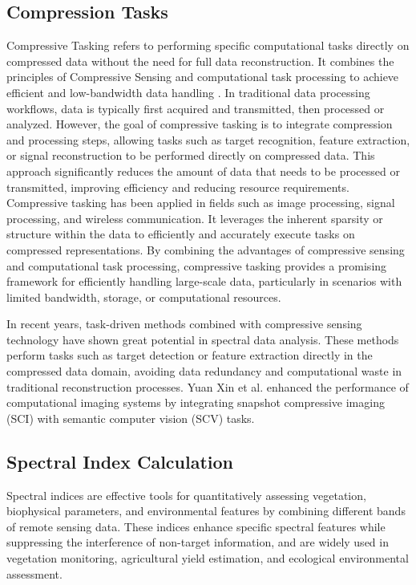 \documentclass[preprint,review,12pt]{elsarticle}
\begin{document}
\subsection{Compression Tasks}
\label{sec:compression_tasks}

Compressive Tasking refers to performing specific computational tasks directly on compressed data without the need for full data reconstruction. It combines the principles of Compressive Sensing and computational task processing to achieve efficient and low-bandwidth data handling \cite{zhang2022}. In traditional data processing workflows, data is typically first acquired and transmitted, then processed or analyzed. However, the goal of compressive tasking is to integrate compression and processing steps, allowing tasks such as target recognition, feature extraction, or signal reconstruction to be performed directly on compressed data. This approach significantly reduces the amount of data that needs to be processed or transmitted, improving efficiency and reducing resource requirements. Compressive tasking has been applied in fields such as image processing, signal processing, and wireless communication. It leverages the inherent sparsity or structure within the data to efficiently and accurately execute tasks on compressed representations. By combining the advantages of compressive sensing and computational task processing, compressive tasking provides a promising framework for efficiently handling large-scale data, particularly in scenarios with limited bandwidth, storage, or computational resources.

In recent years, task-driven methods combined with compressive sensing technology have shown great potential in spectral data analysis. These methods perform tasks such as target detection or feature extraction directly in the compressed data domain, avoiding data redundancy and computational waste in traditional reconstruction processes. Yuan Xin et al. enhanced the performance of computational imaging systems by integrating snapshot compressive imaging (SCI) with semantic computer vision (SCV) tasks.

\subsection{Spectral Index Calculation}
\label{sec:spectral_index}

Spectral indices are effective tools for quantitatively assessing vegetation, biophysical parameters, and environmental features by combining different bands of remote sensing data. These indices enhance specific spectral features while suppressing the interference of non-target information, and are widely used in vegetation monitoring, agricultural yield estimation, and ecological environmental assessment.
\end{document}
